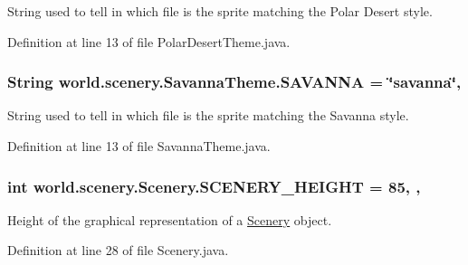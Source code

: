 String used to tell in which file is the sprite matching the Polar Desert style. 



Definition at line 13 of file Polar\-Desert\-Theme.\-java.

\hypertarget{interfaceworld_1_1scenery_1_1_savanna_theme_a69e8a9867db3a93074a41573940424b2}{
\subsubsection[{S\-A\-V\-A\-N\-N\-A}]{\setlength{\rightskip}{0pt plus 5cm}String world.\-scenery.\-Savanna\-Theme.\-S\-A\-V\-A\-N\-N\-A = \char`\"{}savanna\char`\"{}\hspace{0.3cm}{\ttfamily [static]}, {\ttfamily [inherited]}}}\label{interfaceworld_1_1scenery_1_1_savanna_theme_a69e8a9867db3a93074a41573940424b2}


String used to tell in which file is the sprite matching the Savanna style. 



Definition at line 13 of file Savanna\-Theme.\-java.

\hypertarget{classworld_1_1scenery_1_1_scenery_a106e53ae6e1647395740237ccce7f363}{
\subsubsection[{S\-C\-E\-N\-E\-R\-Y\-\_\-\-H\-E\-I\-G\-H\-T}]{\setlength{\rightskip}{0pt plus 5cm}int world.\-scenery.\-Scenery.\-S\-C\-E\-N\-E\-R\-Y\-\_\-\-H\-E\-I\-G\-H\-T = 85\hspace{0.3cm}{\ttfamily [static]}, {\ttfamily [protected]}, {\ttfamily [inherited]}}}\label{classworld_1_1scenery_1_1_scenery_a106e53ae6e1647395740237ccce7f363}


Height of the graphical representation of a \hyperlink{classworld_1_1scenery_1_1_scenery}{Scenery} object. 



Definition at line 28 of file Scenery.\-java.



